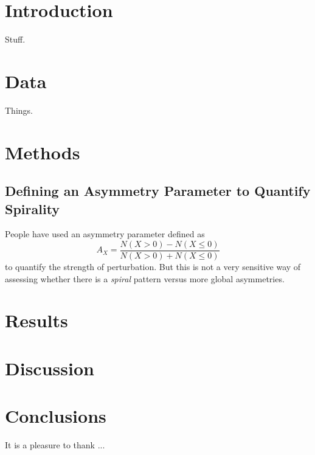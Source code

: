 \section{Introduction} \label{sec:intro}

Stuff.


\section{Data} \label{sec:data}

Things.


\section{Methods} \label{sec:methods}

\subsection{Defining an Asymmetry Parameter to Quantify Spirality}

People have used an asymmetry parameter defined as
\begin{equation}
    A_X = \frac{N(X>0) - N(X\leq0)}{N(X>0) + N(X\leq0)}
\end{equation}
to quantify the strength of perturbation. But this is not a very sensitive way
of assessing whether there is a \emph{spiral} pattern versus more global
asymmetries.

\section{Results} \label{sec:results}

\section{Discussion} \label{sec:discussion}

\section{Conclusions} \label{sec:conclusions}


\acknowledgements

It is a pleasure to thank ...


